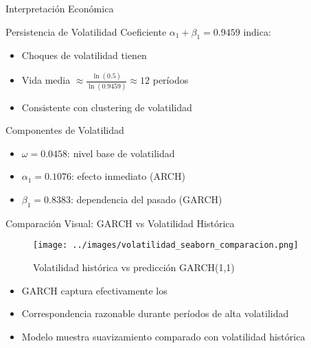 \begin{frame}{Interpretación Económica}
    \begin{block}{Persistencia de Volatilidad}
        Coeficiente $\alpha_1 + \beta_1 = 0.9459$ indica:
        \begin{itemize}
            \item Choques de volatilidad tienen 
            \item Vida media $\approx \frac{\ln(0.5)}{\ln(0.9459)} \approx 12$ períodos
            \item Consistente con clustering de volatilidad
        \end{itemize}
    \end{block}
    
    \vspace{0.5em}
    
    \begin{block}{Componentes de Volatilidad}
        \begin{itemize}
            \item<2-> $\omega = 0.0458$: nivel base de volatilidad
            \item<3-> $\alpha_1 = 0.1076$: efecto inmediato (ARCH)
            \item<4-> $\beta_1 = 0.8383$: dependencia del pasado (GARCH)
        \end{itemize}
    \end{block}
\end{frame}

\begin{frame}{Comparación Visual: GARCH vs Volatilidad Histórica}
    \begin{figure}
        \centering
        \texttt{[image: ../images/volatilidad\_seaborn\_comparacion.png]}
        \caption{Volatilidad histórica vs predicción GARCH(1,1)}
    \end{figure}
    
    \vspace{0.3em}
    
    \begin{itemize}
        \item<2-> GARCH captura efectivamente los 
        \item<3-> Correspondencia razonable durante períodos de alta volatilidad
        \item<4-> Modelo muestra suavizamiento comparado con volatilidad histórica
    \end{itemize}
\end{frame}

